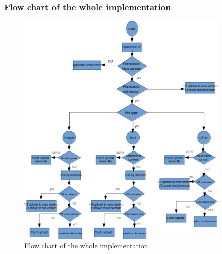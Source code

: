 \documentclass[12pt,a4]{article}
\begin{document}
\subsubsection{Flow chart of the whole implementation}\label{4.2.3}
\begin{figure}[h]%
		\centering  %
		\includegraphics[width=4in]{figure/blur}  	%
		\caption{Flow chart of the whole implementation
}   %
		\end{figure}
\end{document}
